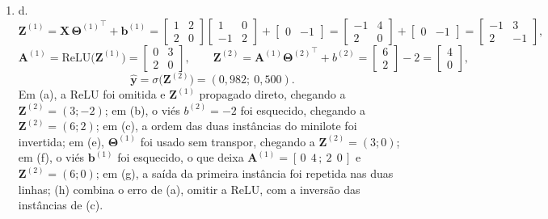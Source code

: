 \documentclass{dlproblemset}
\begin{document}
\begin{enumerate}[1)]
    \item d.
    \[
    \mathbf{Z}^{(1)} = \mathbf{X}\,{\mathbf{\Theta}^{(1)}}^{\top} + \mathbf{b}^{(1)}
    = \begin{bmatrix} 1 & 2 \\ 2 & 0 \end{bmatrix}\begin{bmatrix} 1 & 0 \\ -1 & 2 \end{bmatrix} + \begin{bmatrix} 0 & -1 \end{bmatrix}
    = \begin{bmatrix} -1 & 4 \\ 2 & 0 \end{bmatrix} + \begin{bmatrix} 0 & -1 \end{bmatrix}
    = \begin{bmatrix} -1 & 3 \\ 2 & -1 \end{bmatrix},
    \]
    \[
    \mathbf{A}^{(1)} = \mathrm{ReLU}\bigl(\mathbf{Z}^{(1)}\bigr) = \begin{bmatrix} 0 & 3 \\ 2 & 0 \end{bmatrix},
    \qquad
    \mathbf{Z}^{(2)} = \mathbf{A}^{(1)}{\mathbf{\Theta}^{(2)}}^{\top} + b^{(2)} = \begin{bmatrix} 6 \\ 2 \end{bmatrix} - 2 = \begin{bmatrix} 4 \\ 0 \end{bmatrix},
    \]
    \[
    \hat{\mathbf{y}} = \sigma\bigl(\mathbf{Z}^{(2)}\bigr) = (0{,}982;\ 0{,}500).
    \]
    Em (a), a ReLU foi omitida e $\mathbf{Z}^{(1)}$ propagado direto, chegando a $\mathbf{Z}^{(2)} = (3; -2)$; em (b), o viés $b^{(2)} = -2$ foi esquecido, chegando a $\mathbf{Z}^{(2)} = (6; 2)$; em (c), a ordem das duas instâncias do minilote foi invertida; em (e), $\mathbf{\Theta}^{(1)}$ foi usado sem transpor, chegando a $\mathbf{Z}^{(2)} = (3; 0)$; em (f), o viés $\mathbf{b}^{(1)}$ foi esquecido, o que deixa $\mathbf{A}^{(1)} = [\,0\ \ 4\,;\ 2\ \ 0\,]$ e $\mathbf{Z}^{(2)} = (6; 0)$; em (g), a saída da primeira instância foi repetida nas duas linhas; (h) combina o erro de (a), omitir a ReLU, com a inversão das instâncias de (c).


\end{enumerate}
\end{document}
